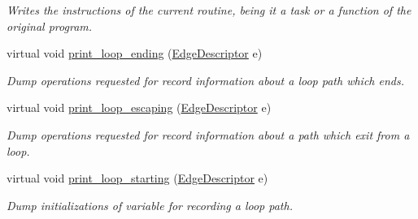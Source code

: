 \begin{DoxyCompactItemize}
\begin{DoxyCompactList}\small\item\em Writes the instructions of the current routine, being it a task or a function of the original program. \end{DoxyCompactList}\item 
virtual void \hyperlink{classEdgeCWriter_ada23a555b6c41e47a8d2a247af5076ae}{print\+\_\+loop\+\_\+ending} (\hyperlink{graph_8hpp_a9eb9afea34e09f484b21f2efd263dd48}{Edge\+Descriptor} e)
\begin{DoxyCompactList}\small\item\em Dump operations requested for record information about a loop path which ends. \end{DoxyCompactList}\item 
virtual void \hyperlink{classEdgeCWriter_a3a3127159498b986420975895b1603f7}{print\+\_\+loop\+\_\+escaping} (\hyperlink{graph_8hpp_a9eb9afea34e09f484b21f2efd263dd48}{Edge\+Descriptor} e)
\begin{DoxyCompactList}\small\item\em Dump operations requested for record information about a path which exit from a loop. \end{DoxyCompactList}\item 
virtual void \hyperlink{classEdgeCWriter_a6be6fd2cc7cd9208b726f9067e7b422d}{print\+\_\+loop\+\_\+starting} (\hyperlink{graph_8hpp_a9eb9afea34e09f484b21f2efd263dd48}{Edge\+Descriptor} e)
\begin{DoxyCompactList}\small\item\em Dump initializations of variable for recording a loop path. \end{DoxyCompactList}\end{DoxyCompactItemize}

